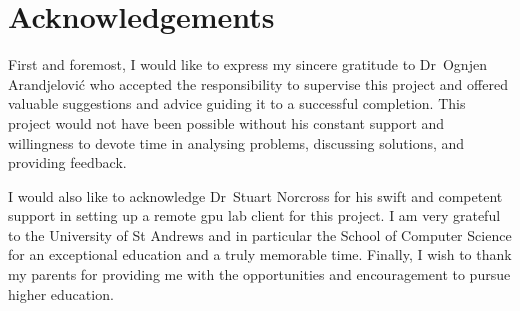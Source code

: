 \documentclass[../report.tex]{subfiles}
\begin{document}
\chapter*{Acknowledgements}

First and foremost, I would like to express my sincere gratitude to Dr~Ognjen Arandjelović who accepted the responsibility to supervise this project and offered valuable suggestions and advice guiding it to a successful completion. 
This project would not have been possible without his constant support and willingness to devote time in analysing problems, discussing solutions, and providing feedback. 

I would also like to acknowledge Dr~Stuart Norcross for his swift and competent support in setting up a remote \acs{gpu} lab client for this project. 
I am very grateful to the University of St Andrews and in particular the School of Computer Science for an exceptional education and a truly memorable time. 
Finally, I wish to thank my parents for providing me with the opportunities and encouragement to pursue higher education.
\end{document}
